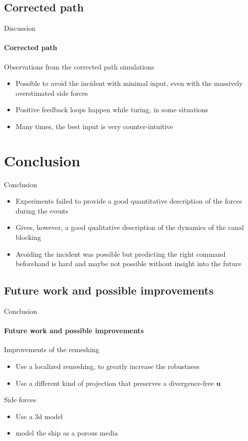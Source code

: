 \documentclass[aspectratio=169]{beamer}
\begin{document}
\subsection{Corrected path}
\begin{frame}{Discussion}
    \framesubtitle{Corrected path}
    
    Observations from the corrected path simulations
    \begin{itemize}
        \item Possible to avoid the incident with minimal input, even with the massively overstimated side forces
        \item Positive feedback loops happen while turing, in some situations
        \item Many times, the best input is very counter-intuitive
    \end{itemize}
\end{frame}


\section{Conclusion}
\begin{frame}{Conclusion}
    \begin{itemize}
        \item Experiments failed to provide a good quantitative description of the forces during the events
        \item Gives, however, a good qualitative description of the dynamics of the canal blocking
        \item Avoiding the incident was possible but predicting the right command beforehand is hard and maybe not possible without insight into the future
    \end{itemize}
\end{frame}


\subsection{Future work and possible improvements}
\begin{frame}{Conclusion}
    \framesubtitle{Future work and possible improvements}
    
    Improvements of the remeshing
    \begin{itemize}
        \item Use a localized remeshing, to greatly increase the robustness
        \item Use a different kind of projection that preserves a divergence-free $\bm{u}$
    \end{itemize}

    \vfill
    Side forces
    \begin{itemize}
        \item Use a 3d model
        \item model the ship as a porous media
    \end{itemize}
\end{frame}
\end{document}
